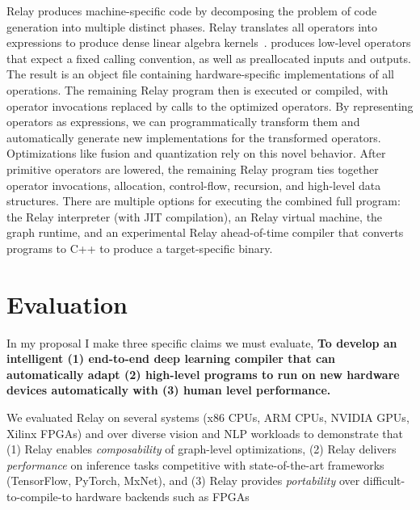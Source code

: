 Relay produces machine-specific code
  by decomposing the problem of code generation into multiple distinct phases.
Relay translates all operators into \tvm expressions
  to produce dense linear algebra kernels~\citep{tvm_osdi18, tensor_comprehensions, halide}.
\tvm produces low-level operators that expect a fixed calling convention,
  as well as preallocated inputs and outputs.
The result is an object file containing hardware-specific implementations of all
  operations.
The remaining Relay program then is executed or compiled,
  with operator invocations replaced by calls to the optimized operators.
By representing operators as \tvm expressions, we can programmatically
  transform them and automatically generate new implementations for the transformed operators.
Optimizations like fusion and quantization
  rely on this novel behavior.
After primitive operators are lowered,
  the remaining Relay program ties
  together operator invocations, allocation, control-flow,
  recursion, and high-level data structures.
There are multiple options for executing the combined full program:
  the Relay interpreter (with JIT compilation),
  an Relay virtual machine,
  the \tvm graph runtime,
  and an experimental Relay ahead-of-time compiler
  that converts programs to C++ to produce a target-specific binary.

\section{Evaluation}
\label{sec:eval}


In my proposal I make three specific claims we must evaluate,
\textbf{To develop an intelligent (1) end-to-end deep learning compiler that can
automatically adapt (2) high-level programs to run on new hardware devices automatically
with (3) human level performance.}

We evaluated Relay on several systems (x86 CPUs, ARM CPUs, NVIDIA GPUs, Xilinx FPGAs) and over
  diverse vision and NLP workloads to demonstrate that (1) Relay enables \emph{composability} of
  graph-level optimizations, (2) Relay delivers \emph{performance} on inference tasks competitive
  with state-of-the-art frameworks (TensorFlow, PyTorch, MxNet), and (3) Relay provides
  \emph{portability} over difficult-to-compile-to hardware backends such as FPGAs

